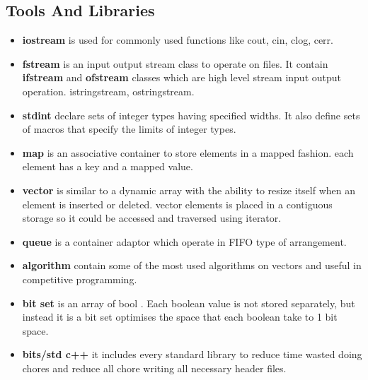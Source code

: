 \documentclass[14 pt,a4paper,double column]{article}
\begin{document}
\subsection{Tools And Libraries }
\begin{itemize}
    \item \textbf{iostream} is used for commonly used functions like cout, cin, clog, cerr.
    \item \textbf{fstream} is an input output stream class to operate on files. It contain \textbf{ifstream} and \textbf{ofstream} classes which are high level stream input output operation.
     istringstream, ostringstream.
    \item \textbf{stdint} declare sets of integer types having specified widths. It also define sets of macros that specify the limits of integer types.
    \item \textbf{map} is an associative container to store elements in a mapped fashion. each element has a key and a mapped value.
    \item \textbf{vector} is similar to a dynamic array with the ability to resize itself when an element is inserted or deleted. vector elements is placed in a contiguous storage so it could be accessed and traversed using iterator. 

    \item \textbf{queue} is a container adaptor which operate in FIFO type of arrangement.
    \item \textbf{algorithm} contain some of the most used algorithms on vectors and useful in competitive programming.
    \item \textbf{bit set} is an array of bool . Each boolean value is not stored separately, but instead it is a bit set optimises the space that each boolean take to 1 bit space.
    \item \textbf{bits/std c++} it includes every standard library to reduce time wasted doing chores and reduce all chore writing all necessary header files. 
\end{itemize}
\end{document}
